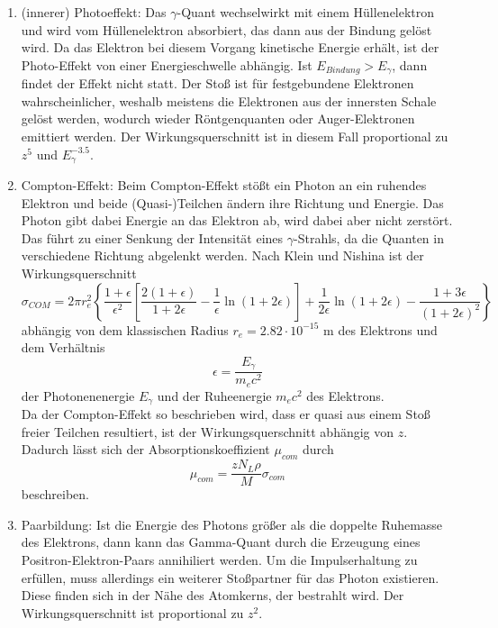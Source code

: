 \begin{enumerate}[nosep,label=\textsc{\arabic*},leftmargin=*]
\item (innerer) Photoeffekt: Das $\gamma$-Quant wechselwirkt mit einem Hüllenelektron und wird vom Hüllenelektron absorbiert, das dann aus der Bindung gelöst wird. Da das Elektron bei diesem Vorgang kinetische Energie erhält, ist der Photo-Effekt von einer Energieschwelle abhängig. Ist $E_{Bindung}>E_\gamma$, dann findet der Effekt nicht statt. Der Stoß ist für festgebundene Elektronen wahrscheinlicher, weshalb meistens die Elektronen aus der innersten Schale gelöst werden, wodurch wieder Röntgenquanten oder Auger-Elektronen emittiert werden. Der Wirkungsquerschnitt ist in diesem Fall proportional zu $z^5$ und $E_\gamma^{-3.5}$.
\item Compton-Effekt: Beim Compton-Effekt stößt ein Photon an ein ruhendes Elektron und beide (Quasi-)Teilchen ändern ihre Richtung und Energie. Das Photon gibt dabei Energie an das Elektron ab, wird dabei aber nicht zerstört. Das führt zu einer Senkung der Intensität eines $\gamma$-Strahls, da die Quanten in verschiedene Richtung abgelenkt werden. Nach Klein und Nishina ist der Wirkungsquerschnitt
\begin{equation}
  \sigma_{COM} = 2\pi r_e^2\left\{\frac{1+\epsilon}{\epsilon^2}\left[\frac{2(1+\epsilon)}{1+2\epsilon}-\frac{1}{\epsilon}\ln(1+2\epsilon)\right]+\frac{1}{2\epsilon}\ln(1+2\epsilon)-\frac{1+3\epsilon}{(1+2\epsilon)^2}\right\} 
  \label{eqlig}
\end{equation}
abhängig von dem klassischen Radius $r_e=2.82\cdot 10^{-15}$ m des Elektrons und dem Verhältnis 
\begin{equation*}
  \epsilon=\frac{E_\gamma}{m_e c^2}
\end{equation*} 
der Photonenenergie $E_\gamma$ und der Ruheenergie $m_e c^2$ des Elektrons.\\
Da der Compton-Effekt so beschrieben wird, dass er quasi aus einem Stoß freier Teilchen resultiert, ist der Wirkungsquerschnitt abhängig von $z$. Dadurch lässt sich der Absorptionskoeffizient $\mu_{com}$ durch
\begin{equation}
  \mu_{com}=\frac{zN_L \rho}{M}\sigma_{com}
  \label{eqlig2}
\end{equation}
beschreiben. 
\item Paarbildung: Ist die Energie des Photons größer als die doppelte Ruhemasse des Elektrons, dann kann das Gamma-Quant durch die Erzeugung eines Positron-Elektron-Paars annihiliert werden. Um die Impulserhaltung zu erfüllen, muss allerdings ein weiterer Stoßpartner für das Photon existieren. Diese finden sich in der Nähe des Atomkerns, der bestrahlt wird. Der Wirkungsquerschnitt ist proportional zu $z^2$.
\end{enumerate}
